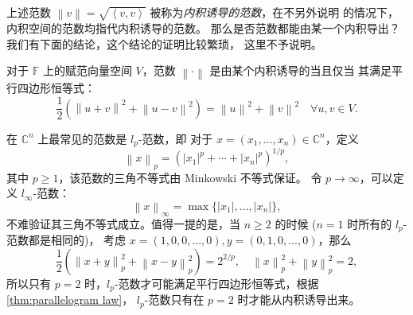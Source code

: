 \documentclass[fontset=none,zihao=-4]{Notes}
\newcommand{\inn}[1]{\left\langle#1\right\rangle}
\newcommand{\norm}[1]{\left\lVert#1\right\rVert}
\begin{document}
上述范数 $\norm{v}=\sqrt{\inn{v,v}}$ 被称为\emph{内积诱导的范数}，在不另外说明
的情况下，内积空间的范数均指代内积诱导的范数。
那么是否范数都能由某一个内积导出？我们有下面的结论，这个结论的证明比较繁琐，
这里不予说明。

\begin{theorem}\label{thm:parallelogram law}
  对于 $\mathbb{F}$ 上的赋范向量空间 $V$，范数 $\norm{\cdot}$ 是由某个内积诱导的当且仅当
  其满足平行四边形恒等式：
  \[
    \frac{1}{2}\left(\norm{u+v}^2+\norm{u-v}^2\right)=\norm{u}^2+\norm{v}^2
    \quad \forall u,v\in V.
  \]
\end{theorem}


在 $\mathbb{C}^n$ 上最常见的范数是 $l_p$-范数，即
对于 $x=(x_1,\dots,x_n)\in\mathbb{C}^n$，定义
\begin{equation*}
  \norm{x}_p=\left(|x_1|^p+\cdots+|x_n|^p\right)^{1/p},
\end{equation*}
其中 $p\geq 1$，该范数的三角不等式由 Minkowski 不等式保证。
令 $p\to\infty$，可以定义 $l_\infty$-范数：
\[
  \norm{x}_{\infty}=\max\{|x_1|,\dots,|x_n|\}  ,
\]
不难验证其三角不等式成立。值得一提的是，当 $n\geq 2$ 的时候 ($n=1$ 时所有的 $l_p$-范数都是相同的)，
考虑 $x=(1,0,0,\dots,0),y=(0,1,0,\dots,0)$，那么
\[
  \frac{1}{2}\left(\norm{x+y}_p^2+\norm{x-y}_p^2\right)=2^{2/p},
  \quad \norm{x}_p^2+\norm{y}_p^2=2,
\]
所以只有 $p=2$ 时，$l_p$-范数才可能满足平行四边形恒等式，根据 \autoref{thm:parallelogram law}，
$l_p$-范数只有在 $p=2$ 时才能从内积诱导出来。
\end{document}
